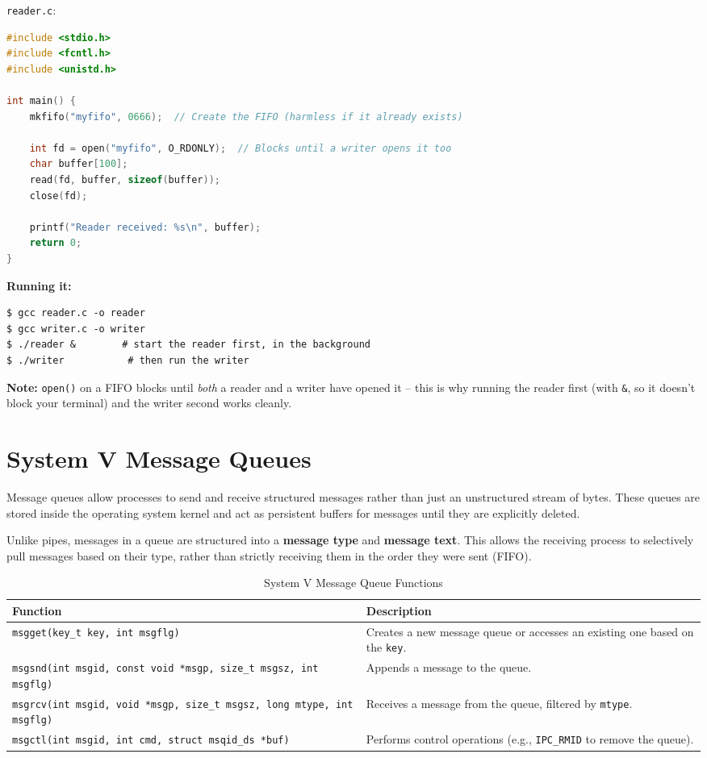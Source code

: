 \texttt{reader.c}:
\begin{lstlisting}[language=C]
#include <stdio.h>
#include <fcntl.h>
#include <unistd.h>

int main() {
    mkfifo("myfifo", 0666);  // Create the FIFO (harmless if it already exists)

    int fd = open("myfifo", O_RDONLY);  // Blocks until a writer opens it too
    char buffer[100];
    read(fd, buffer, sizeof(buffer));
    close(fd);

    printf("Reader received: %s\n", buffer);
    return 0;
}
\end{lstlisting}

\textbf{Running it:}
\begin{lstlisting}[language=Terminal]
$ gcc reader.c -o reader
$ gcc writer.c -o writer
$ ./reader &        # start the reader first, in the background
$ ./writer           # then run the writer
\end{lstlisting}
\textbf{Note:} \texttt{open()} on a FIFO blocks until \emph{both} a reader and a writer have opened it -- this is why running the reader first (with \texttt{\&}, so it doesn't block your terminal) and the writer second works cleanly.

\section{System V Message Queues}
Message queues allow processes to send and receive structured messages rather than just an unstructured stream of bytes. These queues are stored inside the operating system kernel and act as persistent buffers for messages until they are explicitly deleted.

Unlike pipes, messages in a queue are structured into a \textbf{message type} and \textbf{message text}. This allows the receiving process to selectively pull messages based on their type, rather than strictly receiving them in the order they were sent (FIFO).

\begin{table}[h!]
\centering
\small
\renewcommand{\arraystretch}{1.4}
\begin{tabular}{|p{6.5cm}|p{7.5cm}|}
\hline
\textbf{Function} & \textbf{Description} \\ \hline
\texttt{msgget(key\_t key, int msgflg)} & Creates a new message queue or accesses an existing one based on the \texttt{key}. \\ \hline
\texttt{msgsnd(int msgid, const void *msgp, size\_t msgsz, int msgflg)} & Appends a message to the queue. \\ \hline
\texttt{msgrcv(int msgid, void *msgp, size\_t msgsz, long mtype, int msgflg)} & Receives a message from the queue, filtered by \texttt{mtype}. \\ \hline
\texttt{msgctl(int msgid, int cmd, struct msqid\_ds *buf)} & Performs control operations (e.g., \texttt{IPC\_RMID} to remove the queue). \\ \hline
\end{tabular}
\caption{System V Message Queue Functions}
\end{table}

